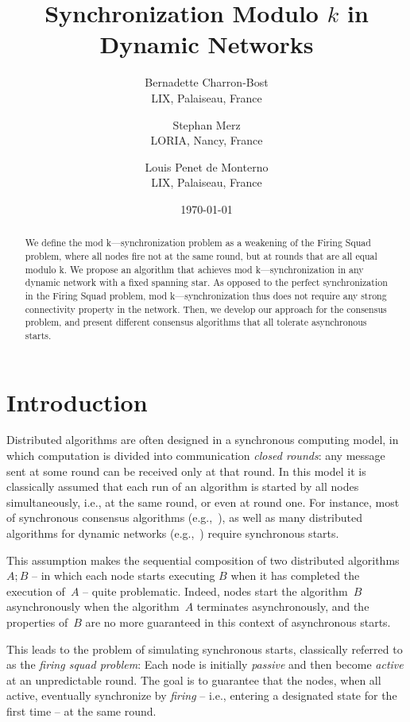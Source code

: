 \documentclass[11pt,letterpaper]{article}
\title{Synchronization Modulo $k$ in Dynamic Networks}
\author{
	Bernadette Charron-Bost \\
	LIX, Palaiseau, France
\and
	Stephan Merz \\
	LORIA, Nancy, France
\and
	Louis Penet de Monterno \\
	LIX, Palaiseau, France
}
\date{\today}
\begin{document}
\maketitle

\begin{abstract}
	We define the mod k—synchronization problem as a weakening of the Firing Squad problem,
	where all nodes fire not at the same round, but at rounds that are all equal modulo k.
	We propose an algorithm that achieves mod k—synchronization  in any dynamic network
	with a fixed spanning star. As opposed to the perfect synchronization in
	the Firing Squad problem, mod k—synchronization thus does not require
	any strong connectivity property in the network. 
	Then, we develop our approach for the consensus problem,
	and present different consensus algorithms that all tolerate asynchronous starts.
\end{abstract}

\section{Introduction}

Distributed algorithms are often designed in a synchronous computing model, in which computation
	is divided into communication {\em closed rounds}:
	any message  sent at some round  can be received only at that round.
In this model it is classically assumed that each run of an algorithm is started by all nodes simultaneously, i.e., at the same round,
	or even at round one.
For instance, most of synchronous consensus algorithms
	(e.g.,~\cite{PSL80,DS83,ST87}), as well as many distributed algorithms for dynamic networks (e.g.,~\cite{KLO10,KMO11})
	require synchronous starts.

This assumption makes the sequential composition of two distributed algorithms $A;B$
	-- in which each node starts executing $B$ when it has completed the execution of~$A$ --
	quite problematic.
Indeed, nodes start the algorithm~$B$ asynchronously when the algorithm~$A$ terminates asynchronously,
	and the properties of~$B$ are no more guaranteed in this context of asynchronous starts.

This leads to the problem of simulating synchronous starts, classically referred to as
	the {\em firing squad problem}:
Each node is  initially  {\em passive} and then become {\em active}  at an unpredictable round.
The goal is to guarantee that   the nodes, when all active, eventually synchronize
	by {\em firing} -- i.e., entering a designated state for the first time -- at the same round.
\end{document}
